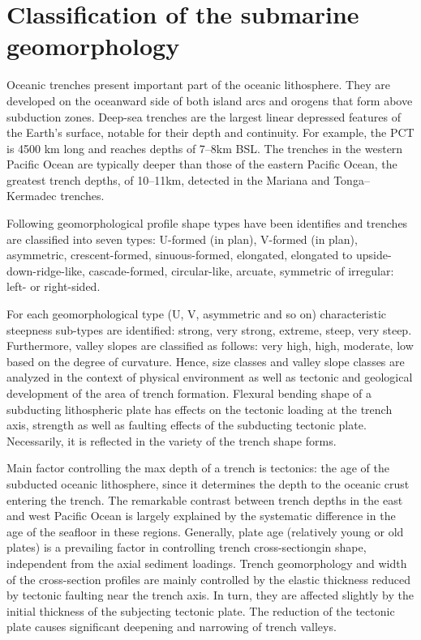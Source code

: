 \documentclass[11pt,a4paper]{report}
\begin{document}
{\section{Classification of the submarine geomorphology}

Oceanic trenches present important part of the oceanic lithosphere. They are developed on the oceanward side of both island arcs and orogens that form above subduction zones. Deep-sea trenches are the largest linear depressed features of the Earth’s surface, notable for their depth and continuity. For example, the \ac{PCT} is 4500 km long and reaches depths of 7--8km \ac{BSL}. The trenches in the western Pacific Ocean are typically deeper than those of the eastern Pacific Ocean, the greatest trench depths, of 10--11km, detected in the Mariana and Tonga–Kermadec trenches. 

Following geomorphological profile shape types have been identifies and trenches are classified into seven types: U-formed (in plan), V-formed (in plan), asymmetric, crescent-formed, sinuous-formed, elongated, elongated to upside-down-ridge-like, cascade-formed, circular-like, arcuate, symmetric of irregular: left- or right-sided. 

For each geomorphological type (U, V, asymmetric and so on) characteristic steepness sub-types are identified: strong, very strong, extreme, steep, very steep. Furthermore, valley slopes are classified as follows: very high, high, moderate, low based on the degree of curvature. Hence, size classes and valley slope classes are analyzed in the context of physical environment as well as tectonic and geological development of the area of trench formation. Flexural bending shape of a subducting lithospheric plate has effects on the tectonic loading at the trench axis, strength as well as faulting effects of the subducting tectonic plate. Necessarily, it is reflected in the variety of the trench shape forms. 

Main factor controlling the max depth of a trench is tectonics: the age of the subducted oceanic lithosphere, since it determines the depth to the oceanic crust entering the trench. The remarkable contrast between trench depths in the east and west Pacific Ocean is largely explained by the systematic difference in the age of the seafloor in these regions. Generally, plate age (relatively young or old plates) is a prevailing factor in controlling trench cross-sectiongin shape, independent from the axial sediment loadings. Trench geomorphology and width of the cross-section profiles are mainly controlled by the elastic thickness reduced by tectonic faulting near the trench axis. In turn, they are affected slightly by the initial thickness of the subjecting tectonic plate. The reduction of the tectonic plate causes significant deepening and narrowing of trench valleys.

}
\end{document}

